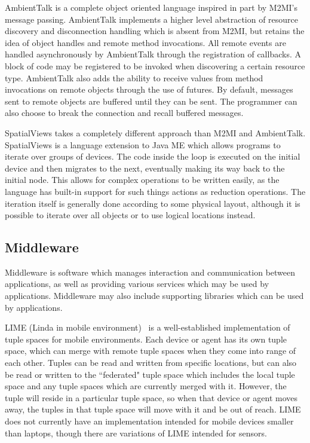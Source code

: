 \documentclass{sig-alternate}
\begin{document}
AmbientTalk is a complete object oriented language inspired in part by M2MI's message passing. AmbientTalk implements a higher level abstraction of resource discovery and disconnection handling which is absent from M2MI, but retains the idea of object handles and remote method invocations. All remote events are handled asynchronously by AmbientTalk through the registration of callbacks. A block of code may be registered to be invoked when discovering a certain resource type. AmbientTalk also adds the ability to receive values from method invocations on remote objects through the use of futures. By default, messages sent to remote objects are buffered until they can be sent. The programmer can also choose to break the connection and recall buffered messages.


SpatialViews takes a completely different approach than M2MI and AmbientTalk. SpatialViews is a language extension to Java ME which allows programs to iterate over groups of devices. The code inside the loop is executed on the initial device and then migrates to the next, eventually making its way back to the initial node. This allows for complex operations to be written easily, as the language has built-in support for such things actions as reduction operations. The iteration itself is generally done according to some physical layout, although it is possible to iterate over all objects or to use logical locations instead.

\subsection{Middleware}

Middleware is software which manages interaction and communication between applications, as well as providing various services which may be used by applications. Middleware may also include supporting libraries which can be used by applications.

LIME (Linda in mobile environment)~\cite{lime} is a well-established implementation of tuple spaces\cite{linda} for mobile environments. Each device or agent has its own tuple space, which can merge with remote tuple spaces when they come into range of each other. Tuples can be read and written from specific locations, but can also be read or written to the ``federated" tuple space which includes the local tuple space and any tuple spaces which are currently merged with it. However, the tuple will reside in a particular tuple space, so when that device or agent moves away, the tuples in that tuple space will move with it and be out of reach. LIME does not currently have an implementation intended for mobile devices smaller than laptops, though there are variations of LIME intended for sensors.
\end{document}
